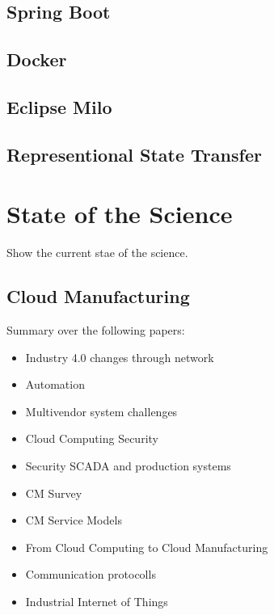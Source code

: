 \documentclass[
a4paper,
twoside,
bibliography=totoc,
headsepline,
cleardoublepage=empty,
parskip=half,
draft=false
]{scrbook}
\begin{document}
		\section{Spring Boot}\label{subsec:spring_boot}
		
		\section{Docker}\label{sec:docker}
		
		\section{Eclipse Milo}\label{sec:eclipse_milo}
		
		\section{Representional State Transfer}\label{sec:rest}
						
	\chapter{State of the Science} \label{ch:state_of_the_Science}
	
		Show the current stae of the science.
		
		\section{Cloud Manufacturing}\label{sec:industry_4}
		
			Summary over the following papers:
			
			\begin{itemize}
				
				\item Industry 4.0 changes through network~\cite{brettel2014virtualization}
				
				\item Automation~\cite{jazdi2014cyber}
				
				\item Multivendor system challenges~\cite{weyer2015towards}
				
				\item Cloud Computing Security~\cite{subashini2011survey}
				
				\item Security SCADA and production systems~\cite{igure2006security}
				
				\item CM Survey~\cite{he2015state}
				
				\item CM Service Models~\cite{li2010cloud}
				
				\item From Cloud Computing to Cloud Manufacturing~\cite{xu2012cloud}
				
				\item Communication protocolls~\cite{wollschlaeger2017future}
				
				\item Industrial Internet of Things~\cite{jeschke2017industrial}
				
			\end{itemize}
		
\end{document}
